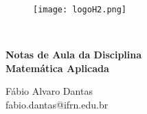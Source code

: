 \thispagestyle{empty}

\begin{figure}[t!]
	\texttt{[image: logoH2.png]}
\end{figure}~
\\
\vspace{60mm}
\begin{center}
\textbf{\huge Notas de Aula da Disciplina \\ Matemática Aplicada}  
\end{center}

\vspace{100mm}

\begin{center}
Fábio Alvaro Dantas\\
fabio.dantas@ifrn.edu.br
\end{center}